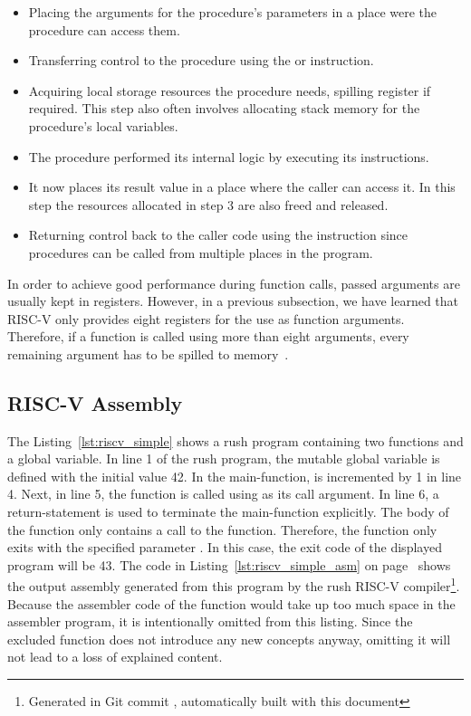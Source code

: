 \begin{itemize}
	\item Placing the arguments for the procedure's parameters in a place were the procedure can access them.
	\item Transferring control to the procedure using the  or  instruction.
	\item Acquiring local storage resources the procedure needs, spilling register if required.
	      This step also often involves allocating stack memory for the procedure's local variables.
	\item The procedure performed its internal logic by executing its instructions.
	\item It now places its result value in a place where the caller can access it.
	      In this step the resources allocated in step 3 are also freed and released.
	\item Returning control back to the caller code using the  instruction since procedures can be called from multiple places in the program.
\end{itemize}

In order to achieve good performance during function calls, passed arguments are usually kept in registers.
However, in a previous subsection, we have learned that RISC-V only provides eight registers for the use as function arguments.
Therefore, if a function is called using more than eight arguments, every remaining argument has to be spilled to memory~\cite[p.~98]{Patterson2017-zq}.



\subsection{RISC-V Assembly}

The Listing~\ref{lst:riscv_simple} shows a rush program containing two functions and a global variable.
In line 1 of the rush program, the mutable global variable  is defined with the initial value 42.
In the main-function,  is incremented by 1 in line 4.
Next, in line 5, the  function is called using  as its call argument.
In line 6, a return-statement is used to terminate the main-function explicitly.
The body of the  function only contains a call to the  function.
Therefore, the  function only exits with the specified parameter .
In this case, the exit code of the displayed program will be 43.
The code in Listing~\ref{lst:riscv_simple_asm} on page~\pageref{lst:riscv_simple_asm} shows the output assembly generated from this program by the rush RISC-V compiler\footnote{Generated in Git commit \rushCommit, automatically built with this document}.
Because the assembler code of the  function would take up too much space in the assembler program, it is intentionally omitted from this listing.
Since the excluded function does not introduce any new concepts anyway, omitting it will not lead to a loss of explained content.

